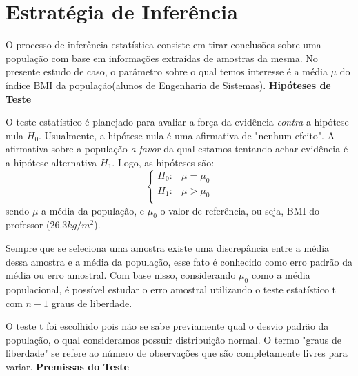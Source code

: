 \documentclass[12pt, a4paper]{article}
\begin{document}
\section{Estratégia de Inferência}
O processo de inferência estatística consiste em tirar conclusões sobre uma população com base em informações extraídas de amostras da mesma. No presente estudo de caso, o parâmetro sobre o qual temos interesse é a média $\mu$ do índice BMI da população(alunos de Engenharia de Sistemas).
\newline
\newline
\textbf{Hipóteses de Teste}
\par O teste estatístico é planejado para avaliar a força da evidência \textit{contra} a hipótese nula $H_{0}$. Usualmente, a hipótese nula é uma afirmativa de "nenhum efeito". A afirmativa sobre a população \textit{a favor} da qual estamos tentando achar evidência é a hipótese alternativa $H_{1}$. Logo, as hipóteses são:
\begin{equation}
\left \{
\begin{array}{cc}
H_{0}: & \mu = \mu_{0} \\
H_{1}: & \mu > \mu_{0} \\
\end{array}
\right.
\end{equation}
\newline sendo $\mu$ a média da população, e $\mu_{0}$ o valor de referência, ou seja, BMI do \linebreak professor ($26.3 kg/m^{2}$).
\par Sempre que se seleciona uma amostra existe uma discrepância entre a média dessa amostra e a média da população, esse fato é conhecido como erro padrão da média ou erro amostral. Com base nisso, considerando $\mu_{0}$ como a média populacional, é possível estudar o erro amostral utilizando o teste estatístico t com $n-1$ graus de liberdade.
\par O teste t foi escolhido pois não se sabe previamente qual o desvio padrão da população, o qual consideramos possuir distribuição normal. O termo "graus de liberdade" se refere ao número de observações que são completamente livres para variar.
\newline
\newline
\textbf{Premissas do Teste}
\end{document}
